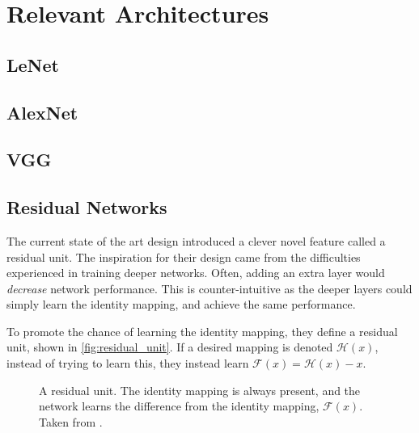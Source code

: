 \section{Relevant Architectures}

\subsection{LeNet}
\subsection{AlexNet}
\subsection{VGG}
\subsection{Residual Networks}
  The current state of the art design introduced a clever novel feature called
  a residual unit\citep{he_deep_2015,he_identity_2016}. The inspiration for their design came from the difficulties
  experienced in training deeper networks. Often, adding an extra layer would
  \emph{decrease} network performance. This is counter-intuitive as the deeper
  layers could simply learn the identity mapping, and achieve the same
  performance.

  To promote the chance of learning the identity mapping, they define
  a residual unit, shown in \autoref{fig:residual_unit}. If a desired mapping
  is denoted $\mathcal{H}(x)$, instead of trying to learn this, they instead
  learn $\mathcal{F}(x) = \mathcal{H}(x) - x$. 
  \begin{figure}
    \centering
    \caption[The residual unit from ResNet]
          {A residual unit. The identity mapping is always present, and the
            network learns the difference from the identity mapping, $\mathcal{F}(x)$.
            Taken from \citep{he_deep_2015}.}
      \label{fig:residual_unit}
  \end{figure}


